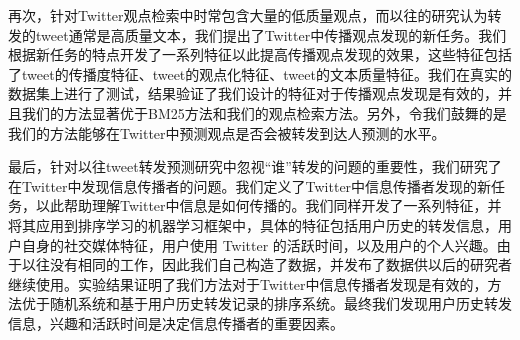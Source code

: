 再次，针对Twitter观点检索中时常包含大量的低质量观点，而以往的研究认为转发的tweet通常是高质量文本，我们提出了Twitter中传播观点发现的新任务。我们根据新任务的特点开发了一系列特征以此提高传播观点发现的效果，这些特征包括了tweet的传播度特征、tweet的观点化特征、tweet的文本质量特征。我们在真实的数据集上进行了测试，结果验证了我们设计的特征对于传播观点发现是有效的，并且我们的方法显著优于BM25方法和我们的观点检索方法。另外，令我们鼓舞的是我们的方法能够在Twitter中预测观点是否会被转发到达人预测的水平。

最后，针对以往tweet转发预测研究中忽视“谁”转发的问题的重要性，我们研究了在Twitter中发现信息传播者的问题。我们定义了Twitter中信息传播者发现的新任务，以此帮助理解Twitter中信息是如何传播的。我们同样开发了一系列特征，并将其应用到排序学习的机器学习框架中，具体的特征包括用户历史的转发信息，用户自身的社交媒体特征，用户使用 Twitter 的活跃时间，以及用户的个人兴趣。由于以往没有相同的工作，因此我们自己构造了数据，并发布了数据供以后的研究者继续使用。实验结果证明了我们方法对于Twitter中信息传播者发现是有效的，方法优于随机系统和基于用户历史转发记录的排序系统。最终我们发现用户历史转发信息，兴趣和活跃时间是决定信息传播者的重要因素。


